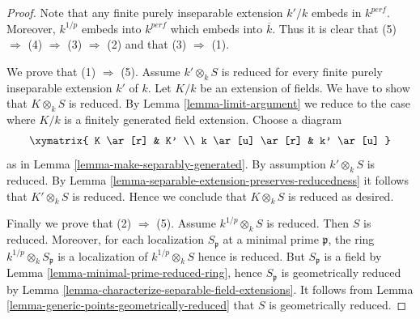 \begin{proof}
Note that any finite purely inseparable extension $k'/k$ embeds
in $k^{perf}$. Moreover, $k^{1/p}$ embeds into $k^{perf}$ which embeds
into $\overline{k}$. Thus it is
clear that (5) $\Rightarrow$ (4) $\Rightarrow$ (3) $\Rightarrow$ (2)
and that (3) $\Rightarrow$ (1).

\medskip\noindent
We prove that (1) $\Rightarrow$ (5).
Assume $k' \otimes_k S$ is reduced for every finite
purely inseparable extension $k'$ of $k$. Let $K/k$ be
an extension of fields. We have to show that $K \otimes_k S$
is reduced. By Lemma \ref{lemma-limit-argument} we reduce to the case where
$K/k$ is a finitely generated field extension. Choose a diagram
$$
\xymatrix{
K \ar[r] & K' \\
k \ar[u] \ar[r] & k' \ar[u]
}
$$
as in Lemma \ref{lemma-make-separably-generated}.
By assumption $k' \otimes_k S$ is reduced.
By Lemma \ref{lemma-separable-extension-preserves-reducedness}
it follows that $K' \otimes_k S$ is reduced.
Hence we conclude that $K \otimes_k S$ is reduced as desired.

\medskip\noindent
Finally we prove that (2) $\Rightarrow$ (5).
Assume $k^{1/p} \otimes_k S$ is reduced. Then $S$ is reduced.
Moreover, for each localization $S_{\mathfrak p}$ at a minimal
prime $\mathfrak p$, the ring $k^{1/p}\otimes_k S_{\mathfrak p}$
is a localization of $k^{1/p} \otimes_k S$ hence is reduced.
But $S_{\mathfrak p}$ is a field by
Lemma \ref{lemma-minimal-prime-reduced-ring},
hence $S_{\mathfrak p}$ is geometrically reduced by
Lemma \ref{lemma-characterize-separable-field-extensions}.
It follows from Lemma \ref{lemma-generic-points-geometrically-reduced}
that $S$ is geometrically reduced.
\end{proof}



